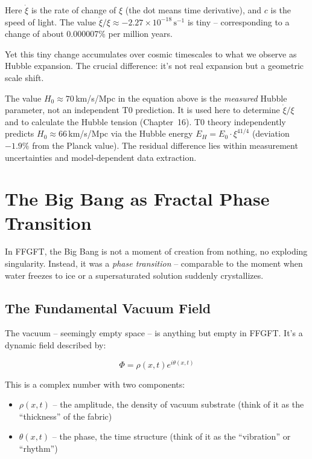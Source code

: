 \documentclass[12pt,a4paper]{article}
\begin{document}
Here $\dot{\xi}$ is the rate of change of $\xi$ (the dot means time derivative), and $c$ is the speed of light. The value $\dot{\xi}/\xi \approx -2.27 \times 10^{-18} \, \text{s}^{-1}$ is tiny -- corresponding to a change of about 0.000007\% per million years.

Yet this tiny change accumulates over cosmic timescales to what we observe as Hubble expansion. The crucial difference: it's not real expansion but a geometric scale shift.

\begin{remark}
The value $H_0 \approx 70\,$km/s/Mpc in the equation above is the \emph{measured} Hubble parameter, not an independent T0 prediction. It is used here to determine $\dot{\xi}/\xi$ and to calculate the Hubble tension (Chapter~16). T0 theory independently predicts $H_0 \approx 66\,$km/s/Mpc via the Hubble energy $E_H = E_0 \cdot \xi^{41/4}$ (deviation $-1.9\%$ from the Planck value). The residual difference lies within measurement uncertainties and model-dependent data extraction.
\end{remark}

\section{The Big Bang as Fractal Phase Transition}

In FFGFT, the Big Bang is not a moment of creation from nothing, no exploding singularity. Instead, it was a \textit{phase transition} -- comparable to the moment when water freezes to ice or a supersaturated solution suddenly crystallizes.

\subsection{The Fundamental Vacuum Field}

The vacuum -- seemingly empty space -- is anything but empty in FFGFT. It's a dynamic field described by:

\begin{equation}
\Phi = \rho(x,t) e^{i\theta(x,t)}
\end{equation}

This is a complex number with two components:
\begin{itemize}[leftmargin=*]
\item $\rho(x,t)$ -- the amplitude, the density of vacuum substrate (think of it as the ``thickness'' of the fabric)
\item $\theta(x,t)$ -- the phase, the time structure (think of it as the ``vibration'' or ``rhythm'')
\end{itemize}
\end{document}
